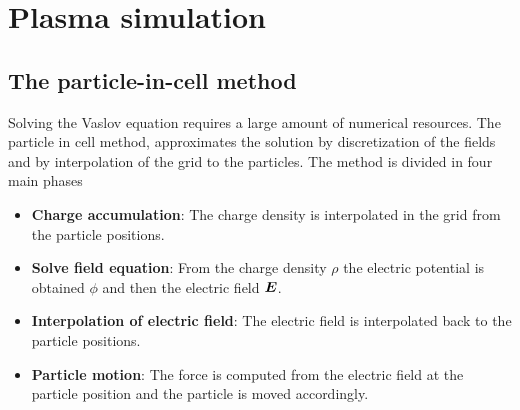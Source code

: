 \chapter{Plasma simulation}
\label{ch:plasma-sim}


\section{The particle-in-cell method}

Solving the Vaslov equation requires a large amount of numerical resources. The 
particle in cell method, approximates the solution by discretization of the 
fields and by interpolation of the grid to the particles. The method is divided 
in four main phases
%
\begin{itemize}
\item \textbf{Charge accumulation}: The charge density is interpolated in the 
grid from the particle positions.
\item \textbf{Solve field equation}: From the charge density $\rho$ the electric 
potential is obtained $\phi$ and then the electric field $\bm{E}$.
\item \textbf{Interpolation of electric field}: The electric field is  
interpolated back to the particle positions.
\item \textbf{Particle motion}: The force is computed from the electric field at 
the particle position and the particle is moved accordingly.
\end{itemize}
%


%
%
%
%
%

